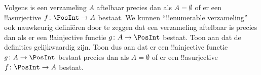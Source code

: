 \documentclass[openany]{memoir}
\begin{document}
\begin{prob}
  Volgens  is een verzameling $A$
  aftelbaar precies dan als $A = \emptyset$ of er een !!a{surjective}
  $f\colon \PosInt \to A$ bestaat. We kunnen ``!!{enumerable}
  verzameling'' ook nauwkeurig definiëren door te zeggen dat een
  verzameling aftelbaar is precies dan als er een !!a{injective} functie
  $g\colon A \to \PosInt$ bestaat. Toon aan dat de definities
  gelijkwaardig zijn. Toon dus aan dat er een !!a{injective} functie
  $g\colon A \to \PosInt$ bestaat precies dan als $A = \emptyset$ of er
  een !!a{surjective} $f\colon \PosInt \to A$ bestaat.
\end{prob}
\endgroup

\begingroup
\def\olfilename{OLP-0030}
\def\olfilepath{content/sets-functions-relations/size-of-sets/}
\hypertarget{unit-OLP-0030}{}




\end{document}
